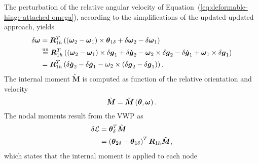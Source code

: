 \documentclass[10pt,dvips,fleqn]{report}
\newcommand{\T}[1]{\boldsymbol{#1}}
\newcommand{\TT}[1]{\boldsymbol{#1}}
\newcommand{\equu}{\overset{\mathrm{uu}}{=}}
\begin{document}
\begin{comment}
The relative angular velocity stems from the time derivative
of $\TT{R}_{1h}^T\TT{R}_{2h}$
\begin{equation}
	\T{\omega} = \T{R}_{1h}^T\plbr{\T{\omega}_2 - \T{\omega}_1} ;
	\label{eq:deformable-hinge-attached-omega}
\end{equation}
in fact, the time derivative of the relative orientation yields
\begin{align}
	\T{\omega} \times{}
	&= \frac{\mathrm{d}}{\mathrm{d}t}\plbr{\T{R}_{1h}^T \T{R}_{2h}}\plbr{\T{R}_{1h}^T \T{R}_{2h}}^T \\
	&= \plbr{\dot{\T{R}}_{1h}^T \T{R}_{2h} + \T{R}_{1h}^T \dot{\T{R}}_{2h}} \T{R}_{2h}^T \T{R}_{1h} \\
	&= \T{R}_{1h}^T \T{\omega}_1 \times{}^T \T{R}_{1h} + \T{R}_{1h}^T \T{\omega}_2 \times \T{R}_{1h} \\
	&= \T{R}_{1h}^T \plbr{\T{\omega}_2 - \T{\omega}_1} \times \T{R}_{1h}
\end{align}
\end{comment}
The perturbation of the relative angular velocity
of Equation~(\ref{eq:deformable-hinge-attached-omega}),
according to the simplifications of the updated-updated approach, yields
\begin{align}
	\delta\T{\omega} &= \T{R}_{1h}^T\plbr{
		\plbr{\T{\omega}_2 - \T{\omega}_1} \times \T{\theta}_{1\delta}
		+ \delta\T{\omega}_2
		- \delta\T{\omega}_1
	} \\
	&\equu \T{R}_{1h}^T\plbr{
		\plbr{\T{\omega}_2 - \T{\omega}_1} \times \delta\T{g}_1
		+ \delta\dot{\T{g}}_2 - \T{\omega}_2 \times \delta\T{g}_2
		- \delta\dot{\T{g}}_1 + \T{\omega}_1 \times \delta\T{g}_1
	} \\
	&= \T{R}_{1h}^T\plbr{
		\delta\dot{\T{g}}_2
		- \delta\dot{\T{g}}_1
		- \T{\omega}_2 \times \plbr{\delta\T{g}_2 - \delta\T{g}_1}
	} .
\end{align}
The internal moment $\tilde{\T{M}}$ is computed as function
of the relative orientation and velocity
\begin{equation}
	\tilde{\T{M}} = \tilde{\T{M}}\plbr{\T{\theta}, \T{\omega}} .
\end{equation}
The nodal moments result from the VWP as
\begin{align}
	\delta\mathcal{L} &= \T{\theta}_{\delta}^T \tilde{\T{M}} \\
	&= \plbr{
		\T{\theta}_{2\delta} - \T{\theta}_{1\delta}
	}^T \T{R}_{1h} \tilde{\T{M}} ,
\end{align}
which states that the internal moment is applied to each node 
\end{document}
